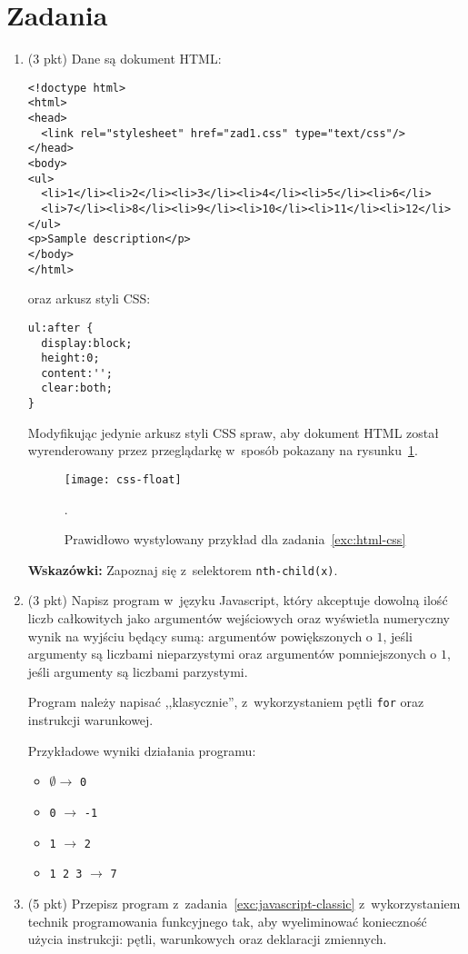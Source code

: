 \documentclass[12pt]{article}
\begin{document}
    \section*{Zadania}
    \begin{enumerate}
        \item\label{exc:html-css}
            (3 pkt) Dane są dokument HTML:
            \begin{verbatim}
<!doctype html>
<html>
<head>
  <link rel="stylesheet" href="zad1.css" type="text/css"/>
</head>
<body>
<ul>
  <li>1</li><li>2</li><li>3</li><li>4</li><li>5</li><li>6</li>
  <li>7</li><li>8</li><li>9</li><li>10</li><li>11</li><li>12</li>
</ul>
<p>Sample description</p>
</body>
</html>
            \end{verbatim}
            oraz arkusz styli CSS:
            \begin{verbatim}
ul:after {
  display:block;
  height:0;
  content:'';
  clear:both;
}
            \end{verbatim}
            Modyfikując jedynie arkusz styli CSS spraw, aby dokument HTML został wyrenderowany przez przeglądarkę w~sposób pokazany na rysunku~\ref{fig:css-float}.
            \begin{figure}[hb]
                \centering
                \texttt{[image: css-float]}
                \caption{Prawidłowo wystylowany przykład dla zadania~\ref{exc:html-css}}.
                \label{fig:css-float}
            \end{figure}

            \textbf{Wskazówki:} Zapoznaj się z~selektorem \texttt{nth-child(x)}.
        \item\label{exc:javascript-classic}
            (3 pkt) Napisz program w~języku Javascript, który akceptuje dowolną ilość liczb całkowitych jako argumentów wejściowych oraz wyświetla numeryczny wynik na wyjściu będący sumą: argumentów powiększonych o $1$, jeśli argumenty są liczbami nieparzystymi oraz argumentów pomniejszonych o $1$, jeśli argumenty są liczbami parzystymi.

            Program należy napisać ,,klasycznie'', z~wykorzystaniem pętli \texttt{for} oraz instrukcji warunkowej.

            Przykładowe wyniki działania programu:
            \begin{multicols}{2}
                \begin{itemize}
                    \item $\emptyset\rightarrow$ \texttt{0}
                    \item \texttt{0} $\rightarrow$ \texttt{-1}
                    \item \texttt{1} $\rightarrow$ \texttt{2}
                    \item \texttt{1 2 3} $\rightarrow$ \texttt{7}
                \end{itemize}
            \end{multicols}
        \item
            (5 pkt) Przepisz program z~zadania~\ref{exc:javascript-classic} z~wykorzystaniem technik programowania funkcyjnego tak, aby wyeliminować konieczność użycia instrukcji: pętli, warunkowych oraz deklaracji zmiennych.


\end{enumerate}
\end{document}
